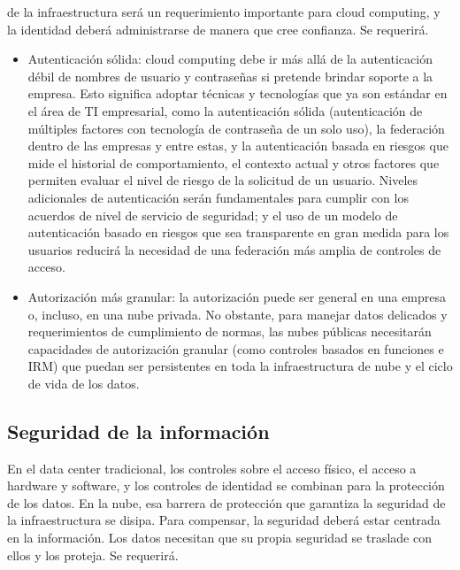 \documentclass[12pt,a4paper]{article}
\begin{document}
de la infraestructura será un requerimiento importante para
cloud computing, y la identidad deberá administrarse de
manera que cree confianza. Se requerirá.
\begin{itemize}

\item Autenticación sólida: cloud computing debe ir más
allá de la autenticación débil de nombres de usuario y
contraseñas si pretende brindar soporte a la empresa.
Esto significa adoptar técnicas y tecnologías que ya
son estándar en el área de TI empresarial, como la
autenticación sólida (autenticación de múltiples
factores con tecnología de contraseña de un solo uso),
la federación dentro de las empresas y entre estas, y la
autenticación basada en riesgos que mide el historial de
comportamiento, el contexto actual y otros factores que
permiten evaluar el nivel de riesgo de la solicitud de un
usuario. Niveles adicionales de autenticación serán
fundamentales para cumplir con los acuerdos de nivel
de servicio de seguridad; y el uso de un modelo de
autenticación basado en riesgos que sea transparente
en gran medida para los usuarios reducirá la necesidad
de una federación más amplia de controles de acceso.

\item Autorización más granular: la autorización puede
ser general en una empresa o, incluso, en una nube
privada. No obstante, para manejar datos delicados y
requerimientos de cumplimiento de normas, las nubes
públicas necesitarán capacidades de autorización
granular (como controles basados en funciones e IRM)
que puedan ser persistentes en toda la infraestructura
de nube y el ciclo de vida de los datos.

\end{itemize}

\subsection{Seguridad de la información}
En el data center tradicional, los controles sobre el acceso
físico, el acceso a hardware y software, y los controles de
identidad se combinan para la protección de los datos. En la
nube, esa barrera de protección que garantiza la seguridad
de la infraestructura se disipa. Para compensar, la seguridad
deberá estar centrada en la información. Los datos necesitan
que su propia seguridad se traslade con ellos y los proteja.
Se requerirá.
\end{document}
